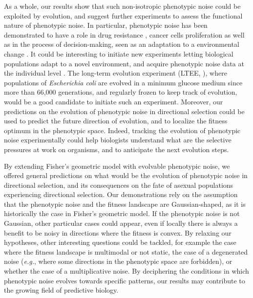 As a whole, our results show that such non-isotropic phenotypic noise could be exploited by evolution, and suggest further experiments to assess the functional nature of phenotypic noise. In particular, phenotypic noise has been demonstrated to have a role in drug resistance \citep{singh-et-al-2010,charlebois-et-al-2014,charlebois-2015}, cancer cells proliferation \citep{gascoigne-taylor-2008,cohen-et-al-2008,huang-2012,pisco-et-al-2013} as well as in the process of decision-making, seen as an adaptation to a environmental change \citep{richard-et-al-2016}. It could be interesting to initiate new experiments letting biological populations adapt to a novel environment, and acquire phenotypic noise data at the individual level \citep{ohya-et-al-2015}. The long-term evolution experiment (LTEE, \citealt{elena-and-lenski-2003}), where populations of \textit{Escherichia coli} are evolved in a minimum glucose medium since more than 66,000 generations, and regularly frozen to keep track of evolution, would be a good candidate to initiate such an experiment. Moreover, our predictions on the evolution of phenotypic noise in directional selection could be used to predict the future direction of evolution, and to localize the fitness optimum in the phenotypic space. Indeed, tracking the evolution of phenotypic noise experimentally could help biologists understand what are the selective pressures at work on organisms, and to anticipate the next evolution steps.

By extending Fisher's geometric model with evolvable phenotypic noise, we offered general predictions on what would be the evolution of phenotypic noise in directional selection, and its consequences on the fate of asexual populations experiencing directional selection.
Our demonstrations rely on the assumption that the phenotypic noise and the fitness landscape are Gaussian-shaped, as it is historically the case in Fisher's geometric model. If the phenotypic noise is not Gaussian, other particular cases could appear, even if locally there is always a benefit to be noisy in directions where the fitness is convex. By relaxing our hypotheses, other interesting questions could be tackled, for example the case where the fitness landscape is multimodal or not static, the case of a degenerated noise (\textit{e.g.}, where some directions in the phenotypic space are forbidden), or whether the case of a multiplicative noise. By deciphering the conditions in which phenotypic noise evolves towards specific patterns, our results may contribute to the growing field of predictive biology.

